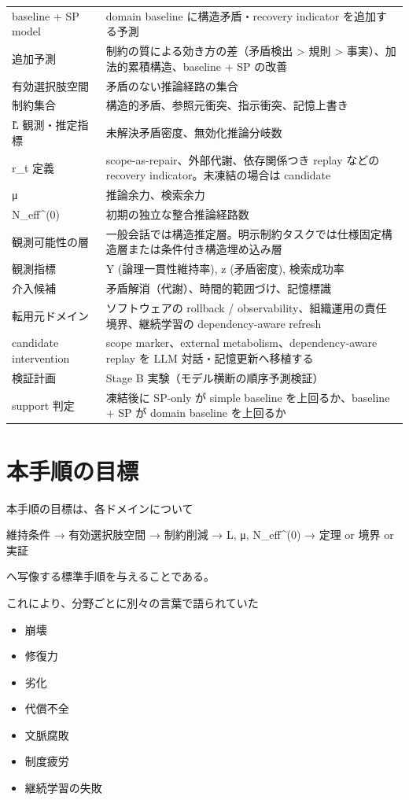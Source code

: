 \documentclass[12pt,a4paper]{article}
\begin{document}
{\begin{longtable}[]{@{}
  >{\raggedright\arraybackslash}p{}
  >{\raggedright\arraybackslash}p{}@{}}
baseline + SP model & domain baseline に構造矛盾・recovery indicator を追加する予測 \\
追加予測 & 制約の質による効き方の差（矛盾検出 \textgreater{} 規則 \textgreater{} 事実）、加法的累積構造、baseline + SP の改善 \\
有効選択肢空間 & 矛盾のない推論経路の集合 \\
制約集合 & 構造的矛盾、参照元衝突、指示衝突、記憶上書き \\
L̂ 観測・推定指標 & 未解決矛盾密度、無効化推論分岐数 \\
r\_t 定義 & scope-as-repair、外部代謝、依存関係つき replay などの recovery indicator。未凍結の場合は candidate \\
μ & 推論余力、検索余力 \\
N\_eff\^{}(0) & 初期の独立な整合推論経路数 \\
観測可能性の層 & 一般会話では構造推定層。明示制約タスクでは仕様固定構造層または条件付き構造埋め込み層 \\
観測指標 & Y (論理一貫性維持率), z (矛盾密度), 検索成功率 \\
介入候補 & 矛盾解消（代謝）、時間的範囲づけ、記憶標識 \\
転用元ドメイン & ソフトウェアの rollback / observability、組織運用の責任境界、継続学習の dependency-aware refresh \\
candidate intervention & scope marker、external metabolism、dependency-aware replay を LLM 対話・記憶更新へ移植する \\
検証計画 & Stage B 実験（モデル横断の順序予測検証） \\
support 判定 & 凍結後に SP-only が simple baseline を上回るか、baseline + SP が domain baseline を上回るか \\
\end{longtable}
}

\section{本手順の目標}\label{ux672cux624bux9806ux306eux76eeux6a19}

本手順の目標は、各ドメインについて

維持条件 → 有効選択肢空間 → 制約削減 → L, μ, N\_eff\^{}(0) → 定理 or 境界 or 実証

へ写像する標準手順を与えることである。

これにより、分野ごとに別々の言葉で語られていた

\begin{itemize}
\tightlist
\item
  崩壊
\item
  修復力
\item
  劣化
\item
  代償不全
\item
  文脈腐敗
\item
  制度疲労
\item
  継続学習の失敗
\end{itemize}
\end{document}
